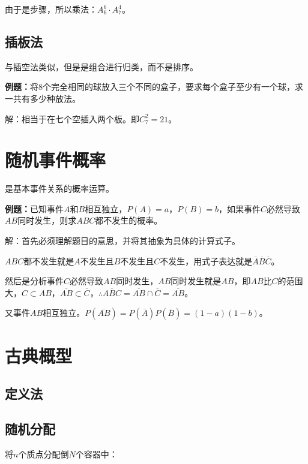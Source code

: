 由于是步骤，所以乘法：$A_6^6\cdot A_7^4$。

\subsection{插板法}

与插空法类似，但是是组合进行归类，而不是排序。

\textbf{例题：}将8个完全相同的球放入三个不同的盒子，要求每个盒子至少有一个球，求一共有多少种放法。

解：相当于在七个空插入两个板。即$C_7^2=21$。

\section{随机事件概率}

是基本事件关系的概率运算。

\textbf{例题：}已知事件$A$和$B$相互独立，$P(A)=a$，$P(B)=b$，如果事件$C$必然导致$AB$同时发生，则求$ABC$都不发生的概率。

解：首先必须理解题目的意思，并将其抽象为具体的计算式子。

$ABC$都不发生就是$A$不发生且$B$不发生且$C$不发生，用式子表达就是$\overline{A}\overline{B}\overline{C}$。

然后是分析事件$C$必然导致$AB$同时发生，$AB$同时发生就是$AB$，即$AB$比$C$的范围大，$C\subset AB$，$\overline{AB}\subset\overline{C}$，$\therefore\overline{ABC}=\overline{AB}\cap\overline{C}=\overline{AB}$。

又事件$AB$相互独立。$P(\overline{AB})=P(\overline{A})P(\overline{B})=(1-a)(1-b)$。

\section{古典概型}

\subsection{定义法}

\subsection{随机分配}

将$n$个质点分配倒$N$个容器中：



